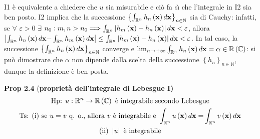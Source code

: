 \documentclass{article}
\begin{document}
I1 \`{e} equivalente a chiedere che $u$ sia misurabile e ci\`{o} fa s\`{\i}
che l'integrale in I2 sia ben posto. I2 implica che la successione $\left\{
\int_{%
\mathbb{R}
^{n}}h_{n}\left( \mathbf{x}\right) d\mathbf{x}\right\} _{n\in 
\mathbb{N}
}$ sia di Cauchy: infatti, se $\forall $ $\varepsilon >0$ $\exists $ $%
n_{0}:m,n>n_{0}\Longrightarrow \int_{%
\mathbb{R}
^{n}}\left\vert h_{m}\left( \mathbf{x}\right) -h_{n}\left( \mathbf{x}\right)
\right\vert d\mathbf{x}<\varepsilon $, allora $\left\vert \int_{%
\mathbb{R}
^{n}}h_{n}\left( \mathbf{x}\right) d\mathbf{x-}\int_{%
\mathbb{R}
^{n}}h_{m}\left( \mathbf{x}\right) d\mathbf{x}\right\vert \leq \int_{%
\mathbb{R}
^{n}}\left\vert h_{m}\left( \mathbf{x}\right) -h_{n}\left( \mathbf{x}\right)
\right\vert d\mathbf{x}<\varepsilon $. In tal caso, la successione $\left\{
\int_{%
\mathbb{R}
^{n}}h_{n}\left( \mathbf{x}\right) d\mathbf{x}\right\} _{n\in 
\mathbb{N}
}$ converge e $\lim_{n\rightarrow +\infty }\int_{%
\mathbb{R}
^{n}}h_{n}\left( \mathbf{x}\right) d\mathbf{x}=\alpha \in 
\mathbb{R}
\left( 
\mathbb{C}
\right) $: si pu\`{o} dimostrare che $\alpha $ non dipende dalla scelta
della successione $\left\{ h_{n}\right\} _{n\in 
\mathbb{N}
}$, dunque la definizione \`{e} ben posta.

\textbf{Prop 2.4} (\textbf{propriet\`{a} dell'integrale di Lebesgue I)}%
\begin{gather*}
\text{Hp: }u:%
\mathbb{R}
^{n}\rightarrow 
\mathbb{R}
\left( 
\mathbb{C}
\right) \text{ \`{e} integrabile secondo Lebesgue} \\
\text{Ts: (i) se }u=v\text{ q. o., allora }v\text{ \`{e} integrabile e }%
\int_{%
\mathbb{R}
^{n}}u\left( \mathbf{x}\right) d\mathbf{x=}\int_{%
\mathbb{R}
^{n}}v\left( \mathbf{x}\right) d\mathbf{x} \\
\text{(ii) }\left\vert u\right\vert \text{ \`{e} integrabile}
\end{gather*}
\end{document}
